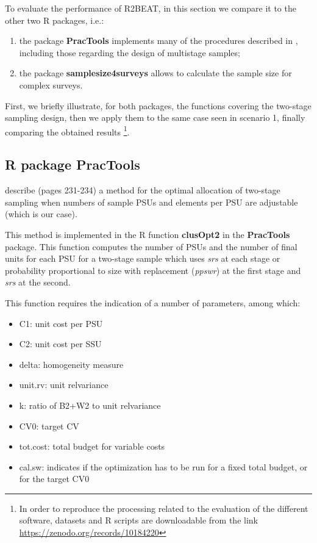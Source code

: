 To evaluate the performance of R2BEAT, in this section we compare it to the other two R packages, i.e.:
\begin{enumerate}
	\item the package \textbf{PracTools} \citep{practools} implements many of the procedures described in \cite{Valliant:2015}, including those regarding the design of multistage samples;
	\item the package \textbf{samplesize4surveys} \citep{Rojas:2020} allows to calculate the sample size for complex surveys.
\end{enumerate}
First, we briefly illustrate, for both packages, the functions covering the two-stage sampling design, then we apply them to the same case seen in scenario 1, finally comparing the obtained results
\footnote{In order to reproduce the processing related to the evaluation of the different software, datasets and R scripts are downloadable from the link  \href{https://zenodo.org/records/10184220}{https://zenodo.org/records/10184220}}.

\subsection{R package PracTools}
\cite{Valliant:2015} describe (pages 231-234) a method for the optimal allocation of two-stage sampling when numbers of sample PSUs and elements per PSU are adjustable (which is our case).

This method is implemented in the R function \textbf{clusOpt2} in the  \textbf{PracTools} package. This function computes the number of PSUs and the number of final units for each PSU for a two-stage sample which uses \textit{srs} at each stage or probability proportional to size with replacement (\textit{ppswr}) at the first stage and \textit{srs} at the second.

This function requires the indication of a number of parameters, among which:
\begin{itemize}
	\item C1: unit cost per PSU
	\item C2: unit cost per SSU
	\item delta: homogeneity measure 
	\item unit.rv: unit relvariance
	\item k: ratio of B2+W2 to unit relvariance
	\item CV0: target CV
	\item tot.cost: total budget for variable costs
	\item cal.sw: indicates if the optimization has to be run for a fixed total budget, or for the target CV0
\end{itemize}

